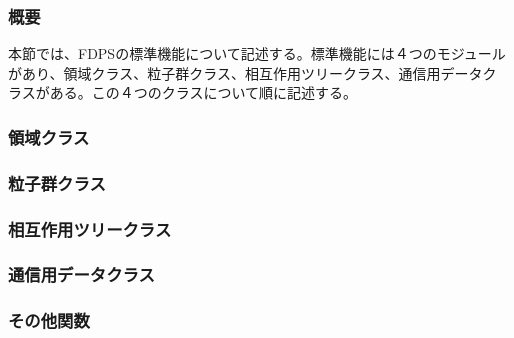 \subsubsection{概要}

本節では、FDPSの標準機能について記述する。標準機能には４つのモジュール
があり、領域クラス、粒子群クラス、相互作用ツリークラス、通信用データク
ラスがある。この４つのクラスについて順に記述する。

\subsubsection{領域クラス}



\subsubsection{粒子群クラス}



\subsubsection{相互作用ツリークラス}



\subsubsection{通信用データクラス}
\label{sect:CommDataClass}


\subsubsection{その他関数}



